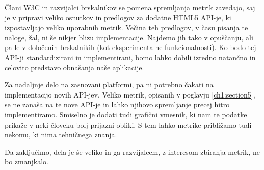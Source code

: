 \documentclass[a4paper, 12pt]{book}
\begin{document}
Člani W3C in razvijalci brskalnikov se pomena spremljanja metrik zavedajo, saj je v pripravi veliko osnutkov in predlogov za dodatne HTML5 API-je, ki izpostavljajo veliko uporabnih metrik. Večina teh predlogov, v času pisanja te naloge, žal, ni še nikjer blizu implementacije. Najdemo jih tako v opuščanju, ali pa le v določenih brskalnikih (kot eksperimentalne funkcionalnosti). Ko bodo tej API-ji standardizirani in implementirani, bomo lahko dobili izredno natančno in celovito predstavo obnašanja naše aplikacije.

Za nadaljnje delo na zasnovani platformi, pa ni potrebno čakati na implementacijo novih API-jev. Veliko metrik, opisanih v poglavju \ref{ch1:section5}, se ne zanaša na te nove API-je in lahko njihovo spremljanje precej hitro implementiramo. Smiselno je dodati tudi grafični vmesnik, ki nam te podatke prikaže v neki človeku bolj prijazni obliki. S tem lahko metrike približamo tudi nekomu, ki nima tehničnega znanja.

Da zaključimo, dela je še veliko in ga razvijalcem, z interesom zbiranja metrik, ne bo zmanjkalo.

\newpage %
\ \\
\clearpage
{}


\end{document}
